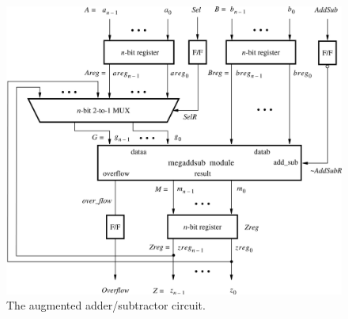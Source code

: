 \documentclass[11pt, twoside, pdftex]{article}
\begin{document}
\begin{figure}[H]
   \begin{center}
      \includegraphics[scale=1]{figures/figure3.png}
   \caption{The augmented adder/subtractor circuit.} 
	 \label{fig:3}
	 \end{center}
\end{figure}  
\end{document}
